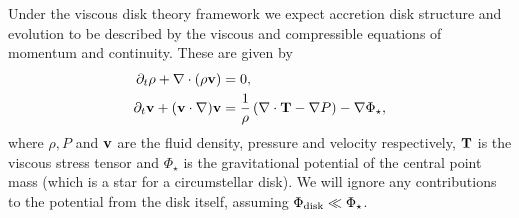 Under the viscous disk theory framework we expect accretion disk structure and evolution to be described by the viscous and compressible equations of momentum and continuity.
These are given by \citep[eg.][]{landau1959}
\begin{align}
    \partial_t \rho + \nabla \cdot (\rho \mathbf{v}) &= 0, \label{eq:fluid_cont} \\
    \partial_t \mathbf{v} + (\mathbf{v} \cdot \nabla) \mathbf{v} &= \frac{1}{\rho} \left( \nabla \cdot \mathbf{T} - \nabla P  \right) - \nabla \Phi_\star, \label{eq:fluid_mom}
\end{align}
where $\rho, P$ and $\mathbf{v}$ are the fluid density, pressure and velocity respectively, $\mathbf{T}$ is the viscous stress tensor and $\Phi_\star$ is the gravitational potential of the central point mass (which is a star for a circumstellar disk).
We will ignore any contributions to the potential from the disk itself, assuming $\Phi_{\rm disk} \ll \Phi_\star$.


